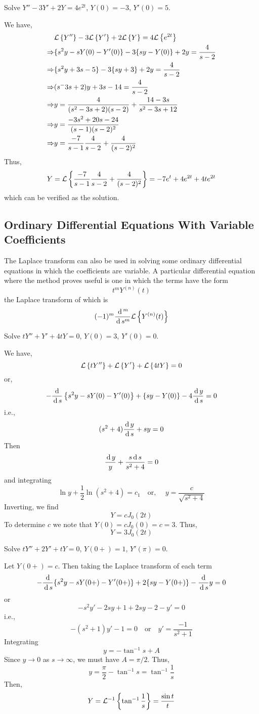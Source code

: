 \documentclass[../main-sheet.tex]{subfiles}
\begin{document}
\newpage
\begin{prob}
    Solve $ Y''-3Y'+2Y=4e^{2t} $, $ Y(0)=-3 $, $ Y'(0)=5 $.
\end{prob}
\begin{soln}
    We have,
    \begin{align*}
        &\mathcal{L}\left\{ Y''\right\}-3\mathcal{L}\left\{ Y'\right\}+2\mathcal{L}\left\{ Y\right\}=4\mathcal{L}\left\{ e^{2t}\right\}\\
        \Rightarrow &\{s^2y-sY(0)-Y'(0)\}-3\{sy-Y(0)\}+2y=\frac{4}{s-2}\\
        \Rightarrow &\{s^2y+3s-5\}-3\{sy+3\}+2y=\frac{4}{s-2}\\
        \Rightarrow &(s^-3s+2)y+3s-14=\frac{4}{s-2}\\
        \Rightarrow &y=\frac{4}{(s^2-3s+2)(s-2)}+\frac{14-3s}{s^2-3s+12}\\
        \Rightarrow &y=\frac{-3s^2+20s-24}{(s-1)(s-2)^2}\\
        \Rightarrow &y=\frac{-7}{s-1}\frac{4}{s-2}+\frac{4}{(s-2)^2}
    \end{align*}
    Thus,
    \[
        Y=\mathcal{L}\left\{ \frac{-7}{s-1}\frac{4}{s-2}+\frac{4}{(s-2)^2}\right\}=-7e^t+4e^{2t}+4te^{2t}
    \]
    which can be verified as the solution.
\end{soln}
\subsection{Ordinary Differential Equations With Variable Coefficients}
The Laplace transform can also be used in solving some ordinary differential equations in which the coefficients are variable. A particular differential equation where the method proves useful is one in which the terms have the form 
\[
    t^m Y^{(n)}(t)
\]
the Laplace transform of which is
\[
    (-1)^m\frac{\,\mathrm{d}\,^m}{\,\mathrm{d}\, s^m}\mathcal{L}\left\{ Y^{(n)}(t)\right\}
\]
\begin{prob}
    Solve $ tY''+Y'+4tY=0 $, $ Y(0)=3 $, $ Y'(0)=0 $.
\end{prob}
\begin{soln}
    We have,
    \[\mathcal{L}\left\{ tY''\right\}+\mathcal{L}\left\{ Y'\right\}+\mathcal{L}\left\{ 4tY\right\}=0\]
    or,
    \[-\frac{\,\mathrm{d}\,}{\,\mathrm{d}\, s}\left\{ s^2y-sY(0)-Y'(0) \right\}+\{sy-Y(0)\}-4\frac{\,\mathrm{d}\, y}{\,\mathrm{d}\, s}=0\]
    i.e.,
    \[(s^2+4)\frac{\,\mathrm{d}\, y}{\,\mathrm{d}\, s}+sy=0\]
    Then 
    \[\frac{\,\mathrm{d}\, y}{y}+\frac{s\,\mathrm{d}\, s}{s^2+4}=0\]
    and integrating 
    \[\ln y+\frac{1}{2}\ln(s^2+4)=c_1\quad \text{or, }\quad y=\frac{c}{\sqrt{s^2+4}}    \]
    Inverting, we find 
    \[Y=cJ_0(2t)\]
    To determine $ c $ we note that $ Y(0)=cJ_0(0)=c=3 $. Thus,
    \[Y=3J_0(2t)\]
\end{soln}
\newpage
\begin{prob}
    Solve $ tY''+2Y'+tY=0 $, $ Y(0+)=1 $, $ Y'(\pi)=0 $.
\end{prob}
\begin{soln}
    Let $ Y(0+)=c $. Then  taking the Laplace transform of each term
    \[-\frac{\,\mathrm{d}\,}{\,\mathrm{d}\, s}\{s^2y-sY(0+)-Y'(0+)\}+2\{sy-Y(0+)\}-\frac{\,\mathrm{d}\,}{\,\mathrm{d}\, s}y=0\]
    or 
    \[-s^2y'-2sy+1+2sy-2-y'=0\]
    i.e.,
    \[-(s^2+1)y'-1=0\quad\text{or}\quad y'=\frac{-1}{s^2+1}\]
    Integrating
    \[y=-\tan^{-1} s+A\]
    Since $ y\to 0 $ as $ s\to \infty $, we must have $ A=\pi/2 $. Thus,
    \[y=\frac{\pi}{2}-\tan^{-1}s=\tan^{-1}\frac{1}{s}\]
    Then,
    \[Y=\mathcal{L}^{-1}\left\{ \tan^{-1}\frac{1}{s}\right\}=\frac{\sin t }{t}\]
\end{soln}
\end{document}
